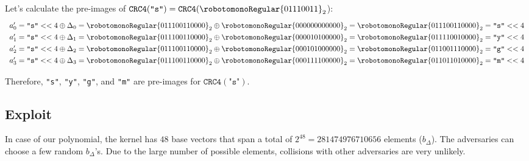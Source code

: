 \documentclass[10pt]{article}
\begin{document}
Let's calculate the pre-images of $\texttt{CRC4}(\texttt{"s"}) = \texttt{CRC4}(\robotomonoRegular{01110011}_2$):
	\begin{equation}
		\def\arraystretch{1.3}
		\begin{array}{lll}
			a'_0  = \texttt{"s"} << 4 \oplus \Delta_0 = \robotomonoRegular{011100110000}_2 \oplus\robotomonoRegular{000000000000}_2 = \robotomonoRegular{011100110000}_2 = \texttt{"s"} << 4 \\
			a'_1  = \texttt{"s"} << 4 \oplus \Delta_1 = \robotomonoRegular{011100110000}_2 \oplus\robotomonoRegular{000010100000}_2 = \robotomonoRegular{011110010000}_2 = \texttt{"y"} << 4 \\
			a'_2  = \texttt{"s"} << 4 \oplus \Delta_2 = \robotomonoRegular{011100110000}_2 \oplus\robotomonoRegular{000101000000}_2 = \robotomonoRegular{011001110000}_2 = \texttt{"g"} << 4 \\
			a'_3  = \texttt{"s"} << 4 \oplus \Delta_3 = \robotomonoRegular{011100110000}_2 \oplus\robotomonoRegular{000111100000}_2 = \robotomonoRegular{011011010000}_2 = \texttt{"m"} << 4 \\
		\end{array}
	\end{equation}

	Therefore, \texttt{"s"}, \texttt{"y"}, \texttt{"g"}, and \texttt{"m"} are pre-images for $\texttt{CRC4}(\texttt{"s"})$.

	\subsection{Exploit}

	In case of our polynomial, the kernel has $48$ base vectors that span a total of $2^{48}=281474976710656$ elements ($b_\Delta$). The adversaries can choose a few random $b_\Delta$'s. Due to the large number of possible elements, collisions with other adversaries are very unlikely.
\end{document}
